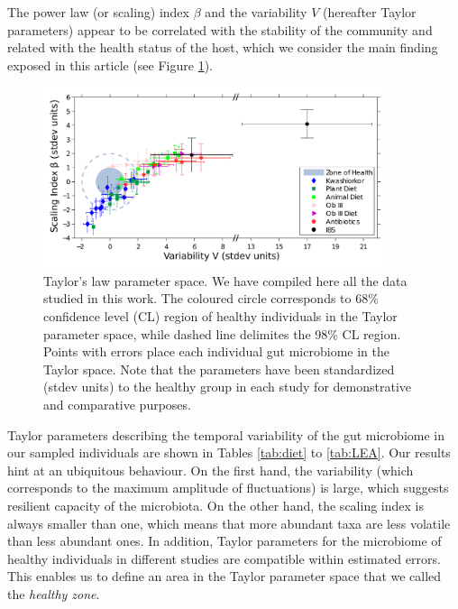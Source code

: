 The power law (or scaling) index $\beta$ and the variability $V$ (hereafter Taylor parameters) appear to be correlated with the stability of the community and related with the health status of the host, which we consider the main finding exposed in this article (see Figure \ref{fig:main2}).

\begin{figure}
	\centering
	\includegraphics[width=0.9\textwidth]{results/finalplot11.pdf}
	\caption{Taylor's law parameter space. We have compiled here all the data studied in this work. The coloured circle corresponds to 68\% confidence level (CL) region of healthy individuals in the Taylor parameter space, while dashed line delimites the 98\% CL region. Points with errors place each individual gut microbiome in the Taylor space. Note that the parameters have been standardized (stdev units) to the healthy group in each study for demonstrative and comparative purposes.}
	\label{fig:main2}
\end{figure}

Taylor parameters describing the temporal variability of the gut microbiome in our sampled individuals are shown in Tables \ref{tab:diet} to \ref{tab:LEA}. Our results hint at an ubiquitous behaviour. On the first hand, the variability (which corresponds to the maximum amplitude of fluctuations) is large, which suggests resilient capacity of the microbiota. On the other hand, the scaling index is always smaller than one, which means that more abundant taxa are less volatile than less abundant ones. In addition, Taylor parameters for the microbiome of healthy individuals in different studies are compatible within estimated errors. This enables us to define an area in the Taylor parameter space that we called the \emph{healthy zone}.

